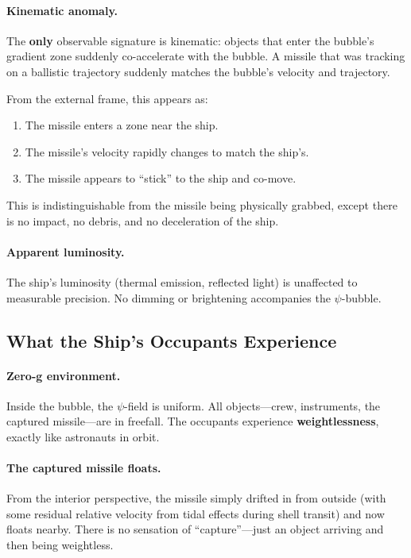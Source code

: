 \documentclass[12pt,aps,prd,superscriptaddress,nofootinbib]{revtex4-2}
\begin{document}
\paragraph{Kinematic anomaly.}
The \textbf{only} observable signature is kinematic: objects that
enter the bubble's gradient zone suddenly co-accelerate with the
bubble. A missile that was tracking on a ballistic trajectory
suddenly matches the bubble's velocity and trajectory.

From the external frame, this appears as:
\begin{enumerate}
\item The missile enters a zone near the ship.
\item The missile's velocity rapidly changes to match the ship's.
\item The missile appears to ``stick'' to the ship and co-move.
\end{enumerate}
This is indistinguishable from the missile being physically grabbed,
except there is no impact, no debris, and no deceleration of the ship.

\paragraph{Apparent luminosity.}
The ship's luminosity (thermal emission, reflected light) is
unaffected to measurable precision. No dimming or brightening
accompanies the $\psi$-bubble.

\subsection{What the Ship's Occupants Experience}

\paragraph{Zero-g environment.}
Inside the bubble, the $\psi$-field is uniform. All objects---crew,
instruments, the captured missile---are in freefall. The occupants
experience \textbf{weightlessness}, exactly like astronauts in
orbit.

\paragraph{The captured missile floats.}
From the interior perspective, the missile simply drifted in from
outside (with some residual relative velocity from tidal effects
during shell transit) and now floats nearby. There is no sensation
of ``capture''---just an object arriving and then being weightless.
\end{document}
